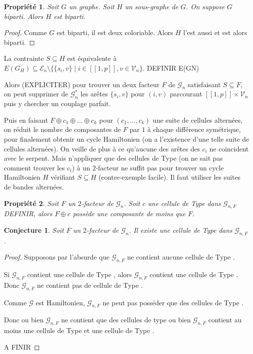 \documentclass[french,a4paper]{article}
\newtheorem{property}{Propriété}[section]
\newtheorem{proof}{Preuve}[section]
\newtheorem{conjecture}{Conjecture}[section]
\begin{document}
\begin{property}
Soit $G$ un graphe. Soit $H$ un sous-graphe de $G$.
On suppose $G$ biparti. Alors $H$ est biparti.
\end{property}

\begin{proof}
Comme $G$ est biparti, il est deux coloriable. Alors $H$ l'est aussi et est alors biparti.
\end{proof}

La contrainte $S \subseteq H$ est équivalente à $E(G_H) \subseteq \mathcal{E}_n \setminus \{\{s_i,v\} \mid i \in [\![1,p]\!], v \in \mathcal{V}_n\}$. DEFINIR E(GN)

Alors (EXPLICITER) pour trouver un deux facteur $F$ de $\mathcal{G}_n$ satisfaisant $S \subseteq F$, on peut supprimer de $\mathcal{G}_{n}^{*}$ les arêtes $\{s_i,v\}$ pour $(i,v)$ parcourant $[\![1,p]\!] \times \mathcal{V}_n$ puis y chercher un couplage parfait.

Puis en faisant $F \oplus c_1 \oplus \dots \oplus c_k$ pour $(c_1,\dots,c_k)$ une suite de cellules alternées, on réduit le nombre de composantes de $F$ par $1$ à chaque différence symétrique, pour finalement obtenir un cycle Hamiltonien (on a l'existence d'une telle suite de cellules alternées). On veille de plus à ce qu'aucune des arêtes des $c_i$ ne coincident avec le serpent. Mais n'appliquer que des cellules de Type  (on ne sait pas comment trouver les $c_i$) à un $2$-facteur ne suffit pas pour trouver un cycle Hamiltonien $H$ vérifiant $S \subseteq H$ (contre-exemple facile). Il faut utiliser les suites de bandes alternées.

\smallskip

\begin{property}
Soit $F$ un $2$-facteur de $\mathcal{G}_n$. Soit $c$ une cellule de Type  dans $\mathcal{G}_{n,F}$ DEFINIR, alors $F \oplus c$ possède une composante de moins que $F$.
\end{property}


\begin{conjecture}
Soit $F$ un $2$-facteur de $\mathcal{G}_n$.
Il existe une cellule de Type  dans $\mathcal{G}_{n,F}$.
\end{conjecture}

\begin{proof}
Supposons par l'absurde que $\mathcal{G}_{n,F}$ ne contient aucune cellule de Type .

Si $\mathcal{G}_{n,F}$ contient une cellule de Type , alors $\mathcal{G}_{n,F}$ contient une cellule de Type . Donc $\mathcal{G}_{n,F}$ ne contient pas de cellule de Type .

Comme $\mathcal{G}$ est Hamiltonien, $\mathcal{G}_{n,F}$ ne peut pas posséder que des cellules de Type .

Donc ou bien $\mathcal{G}_{n,F}$ ne contient que des cellules de type  ou bien $\mathcal{G}_{n,F}$ contient au moins une cellule de Type  et une cellule de Type .

A FINIR
\end{proof}
\end{document}
